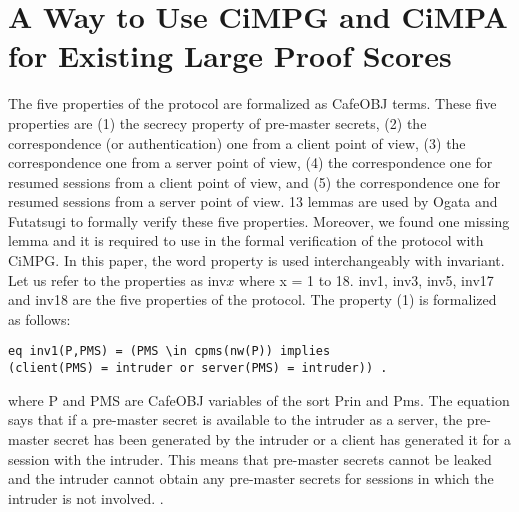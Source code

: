 \documentclass[a4paper,fleqn]{cas-dc}
\begin{document}
\section{A Way to Use CiMPG and CiMPA for Existing Large Proof Scores}\label{fvtls}
The five properties of the protocol \cite{1437139} are formalized as CafeOBJ terms. These five properties are (1) the secrecy property of pre-master secrets, (2) the correspondence (or authentication) one from a client point of view, (3) the correspondence one from a server point of view, (4) the correspondence one for resumed sessions from a client point of view, and (5) the correspondence one for resumed sessions from a server point of view. 13 lemmas are used by Ogata and Futatsugi to formally verify these five properties. Moreover, we found one missing lemma and it is required to use in the formal verification of the protocol with CiMPG. In this paper, the word property is used interchangeably with invariant. Let us refer to the properties as inv\textbf{$x$} where x = 1 to 18. inv1, inv3, inv5, inv17 and inv18 are the five properties of the protocol. The property (1) is formalized as follows: 
\begin{small}
\begin{verbatim}
eq inv1(P,PMS) = (PMS \in cpms(nw(P)) implies 
(client(PMS) = intruder or server(PMS) = intruder)) .
\end{verbatim}
\end{small}
where P and PMS are CafeOBJ variables of the sort Prin and Pms. The equation says that if a pre-master secret is available to the intruder as a server, the pre-master secret has been generated by the intruder or a client has generated it for a session with the intruder. This means that pre-master secrets cannot be leaked and the intruder cannot obtain any pre-master secrets for sessions in which the intruder is not involved. .
\end{document}
